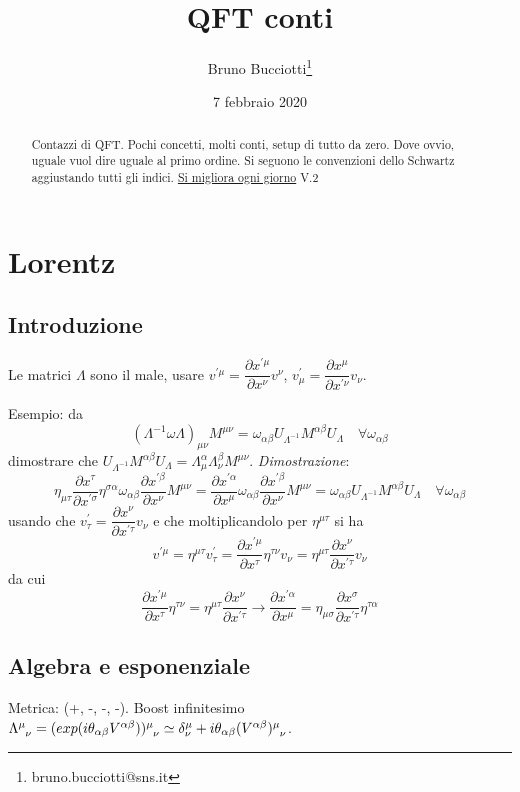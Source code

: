 \documentclass[12pt,a4paper]{article}
\author{Bruno Bucciotti\thanks{bruno.bucciotti@sns.it}}
\title{QFT conti}
\date{7 febbraio 2020}
\begin{document}
	\maketitle
	\begin{abstract}
	Contazzi di QFT. Pochi concetti, molti conti, setup di tutto da zero. Dove ovvio, uguale vuol dire uguale al primo ordine. Si seguono le convenzioni dello Schwartz aggiustando tutti gli indici.
	\href{https://www.youtube.com/watch?v=jZ7oghC1Mro}{Si migliora ogni giorno}
	V.2
	\end{abstract}

	\section{Lorentz}
	\subsection{Introduzione}
	Le matrici $\Lambda$ sono il male, usare $v^{'\mu} = \dfrac{\partial x^{'\mu}}{\partial x^\nu} v^\nu$, $v_\mu^{'} = \dfrac{\partial x^{\mu}}{\partial x^{'\nu}} v_\nu$.
	
	Esempio: da
	\[ (\Lambda^{-1} \omega \Lambda)_{\mu\nu} M^{\mu\nu} = \omega_{\alpha\beta} U_{\Lambda^{-1}} M^{\alpha\beta} U_\Lambda\quad\forall \omega_{\alpha\beta} \]
	dimostrare che $U_{\Lambda^{-1}} M^{\alpha\beta} U_\Lambda = \Lambda^\alpha_\mu \Lambda^\beta_\nu M^{\mu\nu}$. \emph{Dimostrazione}:
	\[ \eta_{\mu\tau} \dfrac{\partial x^\tau}{\partial x^{'\sigma}} \eta^{\sigma\alpha} \omega_{\alpha\beta} \dfrac{\partial x^{' \beta}}{\partial x^\nu} M^{\mu\nu} = \dfrac{\partial x^{'\alpha}}{\partial x^{\mu}} \omega_{\alpha\beta} \dfrac{\partial x^{' \beta}}{\partial x^\nu} M^{\mu\nu} = \omega_{\alpha\beta} U_{\Lambda^{-1}} M^{\alpha\beta} U_\Lambda\quad\forall \omega_{\alpha\beta}\]
	usando che $ v^{'}_\tau = \dfrac{\partial x^\nu}{\partial x^{'\tau}} v_\nu $ e che moltiplicandolo per $\eta^{\mu\tau}$ si ha
	\[ v^{'\mu} = \eta^{\mu\tau} v^{'}_\tau = \dfrac{\partial x^{'\mu}}{\partial x^{\tau}} \eta^{\tau\nu} v_\nu = \eta^{\mu\tau} \dfrac{\partial x^\nu}{\partial x^{'\tau}} v_\nu \]
	da cui
	\[ \dfrac{\partial x^{'\mu}}{\partial x^{\tau}} \eta^{\tau\nu} = \eta^{\mu\tau} \dfrac{\partial x^\nu}{\partial x^{'\tau}}\rightarrow
	\dfrac{\partial x^{'\alpha}}{\partial x^{\mu}} = \eta_{\mu\sigma} \dfrac{\partial x^{\sigma}}{\partial x^{'\tau}} \eta^{\tau\alpha} \]
	
	\subsection{Algebra e esponenziale}
	Metrica: (+, -, -, -). Boost infinitesimo $\Lambda\indices{^\mu_\nu} = (exp(i\theta_{\alpha\beta} V^{\alpha\beta}))\indices{^\mu_\nu} \simeq \delta^\mu_\nu + i\theta_{\alpha\beta} (V^{\alpha\beta})\indices{^\mu_\nu}$.
	
\end{document}
